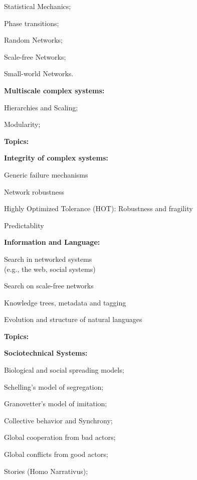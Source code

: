       Statistical Mechanics;
     
      Phase transitions;
     
      Random Networks;
     
      Scale-free Networks;
     
      Small-world Networks.
    
  

  \textbf{Multiscale complex systems:}
    
     
      Hierarchies and Scaling;
     
      Modularity;
    
  


  \textbf{Topics:}

  \textbf{Integrity of complex systems:}
    
     
      Generic failure mechanisms
     
      Network robustness
     
      Highly Optimized Tolerance (HOT): Robustness and fragility
     
      Predictablity
    
  

  \textbf{Information and Language:}
    
     
      Search in networked systems \\ (e.g., the web, social systems)
     
      Search on scale-free networks
     
      Knowledge trees, metadata and tagging
     
      Evolution and structure of natural languages
    
  


  \textbf{Topics:}


  \textbf{Sociotechnical Systems:}
    
     
      Biological and social spreading models;
     
      Schelling's model of segregation;\cite{schelling1971a}
     
      Granovetter's model of imitation;\cite{granovetter1978a}
     
      Collective behavior and Synchrony;
     
      Global cooperation from bad actors;
     
      Global conflicts from good actors;
     
      Stories (Homo Narrativus);
     
